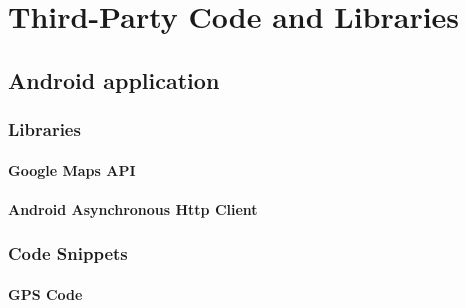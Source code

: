 \chapter{Third-Party Code and Libraries}

\lstjava

\section{Android application}


\subsection{Libraries}

\subsubsection*{Google Maps API}

\subsubsection*{Android Asynchronous Http Client}


\subsection{Code Snippets}

\subsubsection*{GPS Code}

